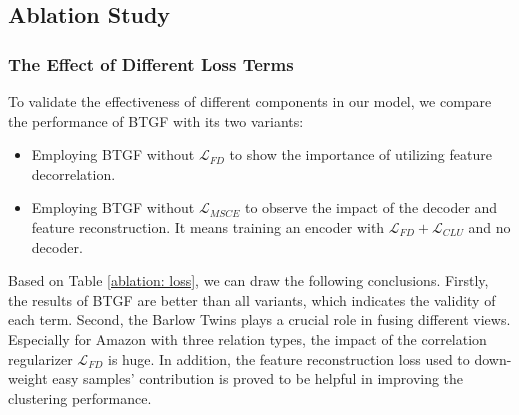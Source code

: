 \documentclass[letterpaper]{article} %
\begin{document}
\subsection{Ablation Study}
\subsubsection{The Effect of Different Loss Terms}

To validate the effectiveness of different components in our model, we compare the performance of BTGF with its two variants:
\begin{itemize}
    \item Employing BTGF without $\mathcal{L}_{FD}$ to show the importance of utilizing feature decorrelation. %
    \item Employing BTGF without $\mathcal{L}_{MSCE}$ to observe the impact of the decoder and feature reconstruction. It means training an encoder with $\mathcal{L}_{FD} + \mathcal{L}_{CLU}$ and no decoder.
\end{itemize}
Based on Table \ref{ablation: loss}, we can draw the following conclusions. Firstly, the results of BTGF are better than all variants, which indicates the validity of each term. Second, the Barlow Twins plays a crucial role in fusing different views. Especially for Amazon with three relation types, the impact of the correlation regularizer $\mathcal{L}_{FD}$ is huge. In addition, the feature reconstruction loss used to down-weight easy samples’ contribution is proved to be helpful in improving the clustering performance.
\end{document}
